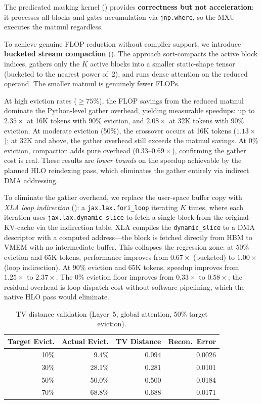 \documentclass[conference,10pt]{IEEEtran}
\begin{document}
The predicated masking kernel () provides
\textbf{correctness but not acceleration}: it processes all blocks and
gates accumulation via \texttt{jnp.where}, so the MXU executes the
matmul regardless.

To achieve genuine FLOP reduction without compiler support, we introduce
\textbf{bucketed stream compaction} (). The
approach sort-compacts the active block indices, gathers only the $K$
active blocks into a smaller static-shape tensor (bucketed to the
nearest power of~2), and runs dense attention on the reduced operand.
The smaller matmul is genuinely fewer FLOPs.

At high eviction rates ($\geq 75\%$), the FLOP savings from the reduced
matmul dominate the Python-level gather overhead, yielding measurable
speedups: up to $2.35\times$ at 16K tokens with 90\% eviction, and
$2.08\times$ at 32K tokens with 90\% eviction. At moderate eviction
(50\%), the crossover occurs at 16K tokens ($1.13\times$); at 32K and
above, the gather overhead still exceeds the matmul savings. At 0\%
eviction, compaction adds pure overhead ($0.33\text{--}0.69\times$),
confirming the gather cost is real. These results are \emph{lower
bounds} on the speedup achievable by the planned HLO reindexing pass,
which eliminates the gather entirely via indirect DMA addressing.

To eliminate the gather overhead, we replace the user-space buffer copy
with \emph{XLA loop indirection} (): a
\texttt{jax.lax.fori\_loop} iterating $K$ times, where each iteration
uses \texttt{jax.lax.dynamic\_slice} to fetch a single block from the
original KV-cache via the indirection table. XLA compiles the
\texttt{dynamic\_slice} to a DMA descriptor with a computed
address---the block is fetched directly from HBM to VMEM with no
intermediate buffer. This collapses the regression zone: at 50\%
eviction and 65K tokens, performance improves from $0.67\times$
(bucketed) to $1.00\times$ (loop indirection). At 90\% eviction and
65K tokens, speedup improves from $1.25\times$ to $2.37\times$. The
0\% eviction floor improves from $0.33\times$ to $0.58\times$; the
residual overhead is loop dispatch cost without software pipelining,
which the native HLO pass would eliminate.

\begin{table}[t]
    \centering
    \caption{TV distance validation (Layer~5, global attention, 50\% target eviction).}
    \label{tab:tv}
    \begin{tabular}{@{}rrrr@{}}
        \toprule
        \textbf{Target Evict.} & \textbf{Actual Evict.} & \textbf{TV Distance} & \textbf{Recon.\ Error} \\
        \midrule
        10\% & 9.4\%  & 0.094 & 0.0026 \\
        30\% & 28.1\% & 0.281 & 0.0101 \\
        50\% & 50.0\% & 0.500 & 0.0184 \\
        70\% & 68.8\% & 0.688 & 0.0171 \\
        \bottomrule
    \end{tabular}
\end{table}
\end{document}
